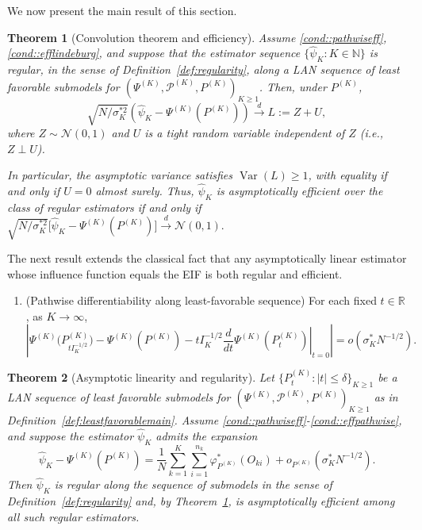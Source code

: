 \documentclass[11pt]{article}
\theoremstyle{plain}
\newtheorem{theorem}{Theorem}
\theoremstyle{definition}
\theoremstyle{remark}
\theoremstyle{definition}
\begin{document}
We now present the main result of this section.
 
 \begin{theorem}[Convolution theorem and efficiency]
\label{theorem::convolution}
Assume  \ref{cond::pathwiseff}, \ref{cond::efflindeburg}, and suppose that the estimator sequence \(\{\widehat{\psi}_K : K \in \mathbb{N}\}\) is regular, in the sense of Definition~\ref{def:regularity}, along a LAN sequence of least favorable submodels for \((\Psi^{(K)}, \mathcal{P}^{(K)}, P^{(K)})_{K \ge 1}\).  
Then, under \(P^{(K)}\),
\[
\sqrt{N / \sigma_K^{*2}} 
\left(\widehat{\psi}_K - \Psi^{(K)}(P^{(K)})\right)
\xrightarrow{d} L := Z + U,
\]
where \( Z \sim \mathcal{N}(0,1) \) and \( U \) is a tight random variable independent of \( Z \) (i.e., \( Z \perp U \)).  

In particular, the asymptotic variance satisfies \(\operatorname{Var}(L) \geq 1\),  
with equality if and only if \(U = 0\) almost surely.  
Thus, \(\widehat{\psi}_K\) is asymptotically efficient over the class of regular estimators if and only if $\sqrt{N / \sigma_K^{*2}}
\bigl[\widehat{\psi}_K - \Psi^{(K)}(P^{(K)})\bigr] 
\xrightarrow{d} \mathcal{N}(0,1).$
\end{theorem}


The next result extends the classical fact that any asymptotically linear estimator whose influence function equals the EIF is both regular and efficient.


\begin{enumerate}[label=\textbf{F\arabic*)}, ref=F\arabic*, resume=eff]
    \item \label{cond::effpathwise} (Pathwise differentiability along least-favorable sequence)  
    For each fixed \(t \in \mathbb{R}\), as \(K \to \infty\),
\[
\left| \Psi^{(K)}\big(P_{t I_K^{-1/2}}^{(K)}\big) - \Psi^{(K)}(P^{(K)}) 
- t I_K^{-1/2} \left.\frac{d}{dt} \Psi^{(K)}(P_t^{(K)})\right|_{t=0} \right| 
= o\!\left(\sigma_K^{*} N^{-1/2}\right).
\]
\end{enumerate}

\begin{theorem}[Asymptotic linearity and regularity]
\label{theorem::regularitymain}
Let \( \{P_t^{(K)} : |t| \le \delta\}_{K \ge 1} \) be a LAN sequence of least favorable submodels for \( (\Psi^{(K)}, \mathcal{P}^{(K)}, P^{(K)})_{K \ge 1} \) as in Definition~\ref{def:leastfavorablemain}.  
Assume  \ref{cond::pathwiseff}-\ref{cond::effpathwise}, and suppose the estimator \( \widehat{\psi}_K \) admits the expansion
\[
\widehat{\psi}_K - \Psi^{(K)}(P^{(K)}) 
= \frac{1}{N} \sum_{k=1}^K \sum_{i=1}^{n_k} \varphi^*_{P^{(K)}}(O_{ki}) 
+ o_{P^{(K)}}\!\left(\sigma_K^* N^{-1/2}\right).
\]
Then \( \widehat{\psi}_K \) is regular along the sequence of submodels in the sense of Definition~\ref{def:regularity} and, by Theorem~\ref{theorem::convolution}, is asymptotically efficient among all such regular estimators.
\end{theorem}
\end{document}
